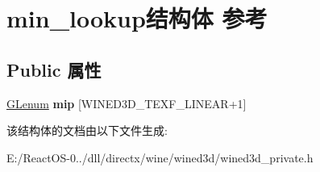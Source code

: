 \hypertarget{structmin__lookup}{}\section{min\+\_\+lookup结构体 参考}
\label{structmin__lookup}
\subsection*{Public 属性}
\begin{DoxyCompactItemize}
\item 
\mbox{\label{structmin__lookup_a454bb05842dff74f0fca41551273605d}} 
\hyperlink{interfacevoid}{G\+Lenum} {\bfseries mip} \mbox{[}W\+I\+N\+E\+D3\+D\+\_\+\+T\+E\+X\+F\+\_\+\+L\+I\+N\+E\+AR+1\mbox{]}
\end{DoxyCompactItemize}


该结构体的文档由以下文件生成\+:\begin{DoxyCompactItemize}
\item 
E\+:/\+React\+O\+S-\/0../dll/directx/wine/wined3d/wined3d\+\_\+private.\+h\end{DoxyCompactItemize}

